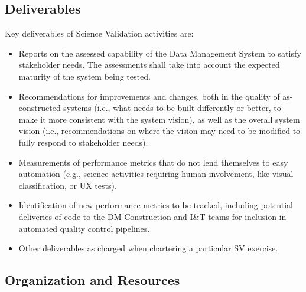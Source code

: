 \subsection{Deliverables}

Key deliverables of Science Validation activities are:
\begin{itemize}

\item Reports on the assessed capability of the Data Management System to
satisfy stakeholder needs.  The assessments shall take into account the
expected maturity of the system being tested.

\item Recommendations for improvements and changes, both in the quality of
as-constructed systems (i.e., what needs to be built differently or better,
to make it more consistent with the system vision), as well as the overall
system vision (i.e., recommendations on where the vision may need to be
modified to fully respond to stakeholder needs).

\item Measurements of performance metrics that do not lend themselves to
easy automation (e.g., science activities requiring human involvement, like
visual classification, or UX tests).

\item Identification of new performance metrics to be tracked, including
potential deliveries of code to the DM Construction and I\&T teams for
inclusion in automated quality control pipelines.

\item Other deliverables as charged when chartering a particular SV exercise.

\end{itemize}

\subsection{Organization and Resources}

